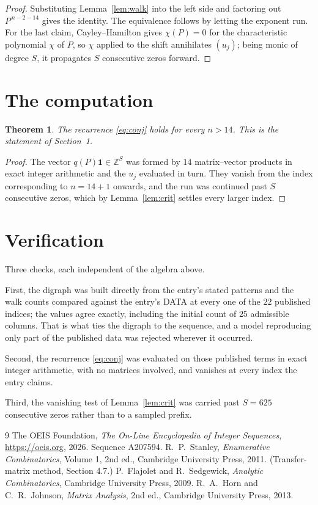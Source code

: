 \documentclass[11pt,a4paper]{article}
\theoremstyle{plain}
\newtheorem{theorem}{Theorem}
\theoremstyle{definition}
\begin{document}
\begin{proof}
Substituting Lemma~\ref{lem:walk} into the left side and factoring out
$P^{\,n-2-14}$ gives the identity. The equivalence follows by letting the exponent
run. For the last claim, Cayley--Hamilton gives $\chi(P)=0$ for the characteristic
polynomial $\chi$ of $P$, so $\chi$ applied to the shift annihilates $(u_j)$; being monic of
degree $S$, it propagates $S$ consecutive zeros forward.
\end{proof}

\section{The computation}

\begin{theorem}
The recurrence \eqref{eq:conj} holds for every $n>14$. This is the statement of
Section~1.
\end{theorem}

\begin{proof}
The vector $q(P)\mathbf{1}\in\mathbb{Z}^{S}$ was formed by $14$ matrix--vector
products in exact integer arithmetic and the $u_j$ evaluated in turn. They vanish from the
index corresponding to $n=14+1$ onwards, and the run was continued past $S$ consecutive
zeros, which by Lemma~\ref{lem:crit} settles every larger index.
\end{proof}

\section{Verification}

Three checks, each independent of the algebra above.

First, the digraph was built directly from the entry's stated patterns and the walk counts
compared against the entry's DATA at every one of the $22$ published indices; the
values agree exactly, including the initial count of $25$ admissible columns. That is
what ties the digraph to the sequence, and a model reproducing only part of the published
data was rejected wherever it occurred.

Second, the recurrence \eqref{eq:conj} was evaluated on those published terms in exact
integer arithmetic, with no matrices involved, and vanishes at every index the entry claims.

Third, the vanishing test of Lemma~\ref{lem:crit} was carried past $S=625$ consecutive
zeros rather than to a sampled prefix.

\begin{thebibliography}{9}
 The OEIS Foundation, \emph{The On-Line Encyclopedia of Integer
Sequences}, \url{https://oeis.org}, 2026. Sequence A207594.
 R.~P.~Stanley, \emph{Enumerative Combinatorics}, Volume 1, 2nd ed.,
Cambridge University Press, 2011. (Transfer-matrix method, Section 4.7.)
 P.~Flajolet and R.~Sedgewick, \emph{Analytic Combinatorics}, Cambridge
University Press, 2009.
 R.~A.~Horn and C.~R.~Johnson, \emph{Matrix Analysis}, 2nd ed., Cambridge
University Press, 2013.
\end{thebibliography}
\end{document}
